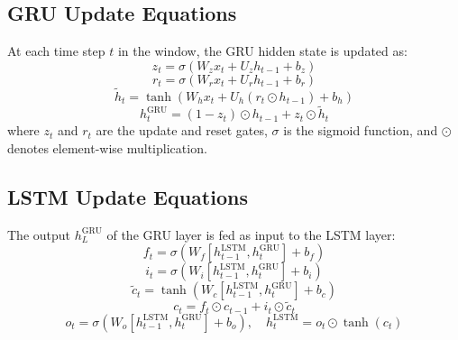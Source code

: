 \subsection{GRU Update Equations}

At each time step $t$ in the window, the GRU hidden state is
updated as:
\begin{equation}
  z_t = \sigma(W_z x_t + U_z h_{t-1} + b_z)
  \label{eq:gru_update}
\end{equation}
\begin{equation}
  r_t = \sigma(W_r x_t + U_r h_{t-1} + b_r)
  \label{eq:gru_reset}
\end{equation}
\begin{equation}
  \tilde{h}_t = \tanh(W_h x_t + U_h (r_t \odot h_{t-1}) + b_h)
  \label{eq:gru_candidate}
\end{equation}
\begin{equation}
  h_t^{\text{GRU}} = (1 - z_t) \odot h_{t-1} + z_t \odot \tilde{h}_t
  \label{eq:gru_hidden}
\end{equation}
where $z_t$ and $r_t$ are the update and reset gates, $\sigma$ is
the sigmoid function, and $\odot$ denotes element-wise
multiplication.

\subsection{LSTM Update Equations}

The output $h_L^{\text{GRU}}$ of the GRU layer is fed as input
to the LSTM layer:
\begin{equation}
  f_t = \sigma(W_f [h_{t-1}^{\text{LSTM}}, h_t^{\text{GRU}}] + b_f)
  \label{eq:lstm_forget}
\end{equation}
\begin{equation}
  i_t = \sigma(W_i [h_{t-1}^{\text{LSTM}}, h_t^{\text{GRU}}] + b_i)
  \label{eq:lstm_input}
\end{equation}
\begin{equation}
  \tilde{c}_t = \tanh(W_c [h_{t-1}^{\text{LSTM}}, h_t^{\text{GRU}}] + b_c)
  \label{eq:lstm_cell_candidate}
\end{equation}
\begin{equation}
  c_t = f_t \odot c_{t-1} + i_t \odot \tilde{c}_t
  \label{eq:lstm_cell}
\end{equation}
\begin{equation}
  o_t = \sigma(W_o [h_{t-1}^{\text{LSTM}}, h_t^{\text{GRU}}] + b_o),
  \quad h_t^{\text{LSTM}} = o_t \odot \tanh(c_t)
  \label{eq:lstm_output}
\end{equation}

